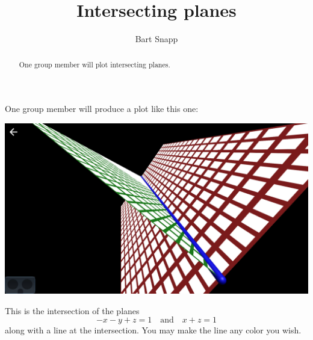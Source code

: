 \documentclass{ximera}
\author{Bart Snapp}
\title{Intersecting planes}
\begin{document}
\begin{abstract}
  One group member will plot intersecting planes.
\end{abstract}
\maketitle

One group member will produce a plot like this one:
\begin{image}
  \includegraphics{intersection.png}
\end{image}

This is the intersection of the planes
\[
-x-y+z=1\quad\text{and}\quad  x+z=1
\]
along with a line at the intersection. You may make the line any
color you wish.
\end{document}
